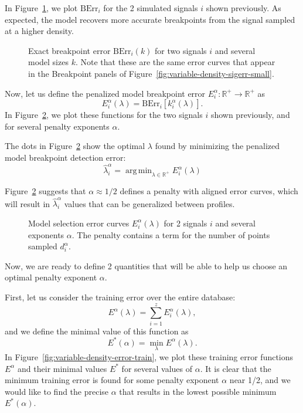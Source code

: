\documentclass{article}
\newcommand{\fig}[3][H]{
  \begin{figure}[#1]
    \hskip -1cm
    
    \caption{#3}
    \label{fig:#2}
  \end{figure}
}
\DeclareMathOperator*{\argmin}{arg\,min}
\newcommand{\RR}{\mathbb{R}}
\begin{document}
In Figure~\ref{fig:variable-density-berr-k}, we plot $\text{BErr}_i$
for the 2 simulated signals $i$ shown previously.  As expected, the
model recovers more accurate breakpoints from the signal sampled at a
higher density.  

\fig{variable-density-berr-k}{Exact breakpoint error
  $\text{BErr}_i(k)$ for two signals $i$ and several model
  sizes $k$. Note that these are the same error curves that appear
in the Breakpoint panels of Figure~\ref{fig:variable-density-sigerr-small}.}

\newpage

Now, let us define the penalized
model breakpoint error $E^\alpha_i:\RR^+\rightarrow\RR^+$ as
\begin{equation}
  \label{eq:lerr}
E^\alpha_i(\lambda) = \text{BErr}_i\left[
k^\alpha_i(\lambda)
\right].
\end{equation}
In Figure~\ref{fig:variable-density-berr}, we plot these functions for the
two signals $i$ shown previously, and for several penalty exponents $\alpha$.

The dots in Figure~\ref{fig:variable-density-berr} show the optimal
$\lambda$ found by minimizing the penalized model breakpoint detection
error:
\begin{equation}
  \label{eq:lambda_hat}
  \hat \lambda^\alpha_i = \argmin_{\lambda\in\RR^+}  E^\alpha_i(\lambda)
\end{equation}

Figure~\ref{fig:variable-density-berr} suggests that $\alpha\approx1/2$
defines a penalty with aligned error curves, which will result in
$\hat \lambda_i^\alpha$ values that can be generalized between
profiles. 

\fig{variable-density-berr}{Model selection error curves
  $E_i^\alpha(\lambda)$ for 2 signals $i$ and several exponents
  $\alpha$. The penalty contains a term for the number of points sampled $d_i^\alpha$.}

\newpage

Now, we are ready to define 2 quantities that will be able to help us
choose an optimal penalty exponent $\alpha$.

First, let us consider the training error over the entire database:
\begin{equation}
  \label{eq:lerr_train}
  E^\alpha(\lambda) = \sum_{i=1}^z E_i^\alpha(\lambda),
\end{equation}
and we define the minimal value of this function as
\begin{equation}
  \label{eq:lerr_train_min}
  E^*(\alpha) = \min_\lambda E^\alpha(\lambda).
\end{equation}
In Figure~\ref{fig:variable-density-error-train}, we plot these
training error functions $E^\alpha$ and their minimal values $E^*$ for
several values of $\alpha$. It is clear that the minimum training
error is found for some penalty exponent $\alpha$ near 1/2, and we
would like to find the precise $\alpha$ that results in the lowest
possible minimum $E^*(\alpha)$.
\end{document}
